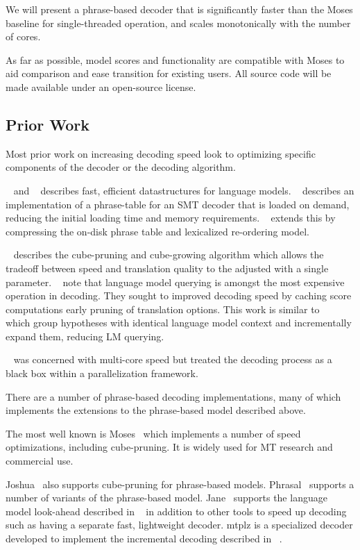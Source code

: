 \documentclass[11pt]{article}
\begin{document}
We will present a phrase-based decoder that is significantly faster than the Moses baseline for single-threaded operation, and scales monotonically with the number of cores.

As far as possible, model scores and functionality are compatible with Moses to aid comparison and ease transition for existing users. All source code will be made available under an open-source license.

\subsection{Prior Work}

Most prior work on increasing decoding speed look to optimizing specific components of the decoder or the decoding algorithm. 

~ and ~ describes fast, efficient datastructures for language models. ~ describes an implementation of a phrase-table for an SMT decoder that is loaded on demand, reducing the initial loading time and memory requirements. ~ extends this by compressing the on-disk phrase table and lexicalized re-ordering model. 

~ describes the cube-pruning and cube-growing algorithm which allows the tradeoff between speed and translation quality to the adjusted with a single parameter. ~ note that language model querying is amongst the most expensive operation in decoding. They sought to improved decoding speed by caching score computations early pruning of translation options. This work is similar to ~ which group hypotheses with identical language model context and incrementally expand them, reducing LM querying.

~ was concerned with multi-core speed but treated the decoding process as a black box within a parallelization framework.

There are a number of phrase-based decoding implementations, many of which implements the extensions to the phrase-based model described above.

The most well known is Moses~\cite{koehn-EtAl:2007:PosterDemo} which implements a number of speed optimizations, including cube-pruning. It is widely used for MT research and commercial use. 

Joshua~\cite{Joshua-Decoder} also supports cube-pruning for phrase-based models. Phrasal~\cite{spence2014phrasal} supports a number of variants of the phrase-based model. Jane~\cite{peitz2012jane} supports the language model look-ahead described in ~ in addition to other tools to speed up decoding such as having a separate fast, lightweight decoder. mtplz is a specialized decoder developed to implement the incremental decoding described in ~.
\end{document}
